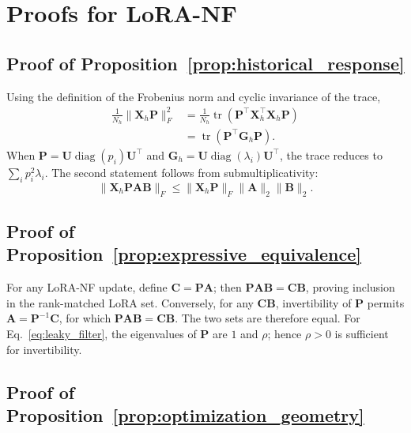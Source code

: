 \section{Proofs for LoRA-NF}
\label{app:lora_nf_proofs}

\subsection{Proof of Proposition~\ref{prop:historical_response}}

Using the definition of the Frobenius norm and cyclic invariance of the trace,
\begin{align}
    \frac{1}{N_h}\|\mathbf{X}_h\mathbf{P}\|_F^2
    &=\frac{1}{N_h}\operatorname{tr}
      (\mathbf{P}^\top\mathbf{X}_h^\top\mathbf{X}_h\mathbf{P})\\
    &=\operatorname{tr}(\mathbf{P}^\top\mathbf{G}_h\mathbf{P}).
\end{align}
When $\mathbf{P}=\mathbf{U}\operatorname{diag}(p_i)\mathbf{U}^\top$ and
$\mathbf{G}_h=\mathbf{U}\operatorname{diag}(\lambda_i)\mathbf{U}^\top$, the trace reduces to $\sum_i p_i^2\lambda_i$. The second statement follows from submultiplicativity:
\begin{equation}
    \|\mathbf{X}_h\mathbf{P}\mathbf{A}\mathbf{B}\|_F
    \leq\|\mathbf{X}_h\mathbf{P}\|_F\|\mathbf{A}\|_2\|\mathbf{B}\|_2.
\end{equation}

\subsection{Proof of Proposition~\ref{prop:expressive_equivalence}}

For any LoRA-NF update, define $\mathbf{C}=\mathbf{P}\mathbf{A}$; then
$\mathbf{P}\mathbf{A}\mathbf{B}=\mathbf{C}\mathbf{B}$, proving inclusion in the rank-matched LoRA set. Conversely, for any $\mathbf{C}\mathbf{B}$, invertibility of $\mathbf{P}$ permits $\mathbf{A}=\mathbf{P}^{-1}\mathbf{C}$, for which $\mathbf{P}\mathbf{A}\mathbf{B}=\mathbf{C}\mathbf{B}$. The two sets are therefore equal. For Eq.~\eqref{eq:leaky_filter}, the eigenvalues of $\mathbf{P}$ are $1$ and $\rho$; hence $\rho>0$ is sufficient for invertibility.

\subsection{Proof of Proposition~\ref{prop:optimization_geometry}}

